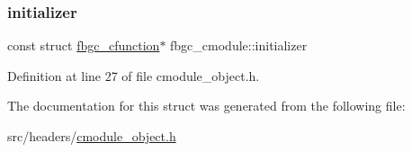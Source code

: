 \mbox{\label{structfbgc__cmodule_a85dcae28e556a5b7360f323589071d04}} 
\subsubsection{\texorpdfstring{initializer}{initializer}}
{\footnotesize\ttfamily const struct \hyperlink{structfbgc__cfunction}{fbgc\+\_\+cfunction}$\ast$ fbgc\+\_\+cmodule\+::initializer}



Definition at line 27 of file cmodule\+\_\+object.\+h.



The documentation for this struct was generated from the following file\+:\begin{DoxyCompactItemize}
\item 
src/headers/\hyperlink{cmodule__object_8h}{cmodule\+\_\+object.\+h}\end{DoxyCompactItemize}
